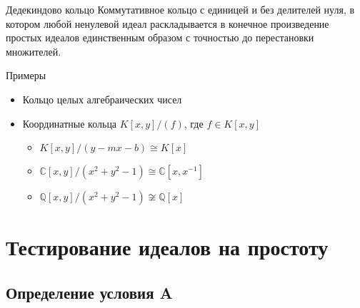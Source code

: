 \documentclass[8pt, xcolor=x11names]{beamer}
\begin{document}
\begin{frame}
    \begin{block}{Дедекиндово кольцо}
        Коммутативное кольцо с единицей и без делителей нуля, в котором любой ненулевой идеал раскладывается в конечное произведение простых идеалов единственным образом с точностью до перестановки множителей.
    \end{block}

    \begin{block}{Примеры}
        \begin{itemize}
            \item Кольцо целых алгебраических чисел
            
            \item Координатные кольца $K[x, y]/(f)$, где $f \in K[x, y]$
            \begin{itemize}
                \item $K[x, y]/(y - mx - b) \cong K[x]$
                \item $\mathbb{C}[x, y]/(x^2 + y^2 - 1) \cong \mathbb{C}[x, x^{-1}]$
                \item $\mathbb{Q}[x, y]/(x^2 + y^2 - 1) \not\cong \mathbb{Q}[x]$
            \end{itemize}
        \end{itemize}
    \end{block}
\end{frame}

\section{Тестирование идеалов на простоту}

\subsection{Определение условия A}
\end{document}
